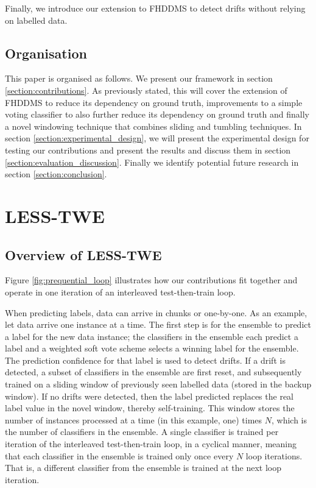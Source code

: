 \documentclass[runningheads]{llncs}
\begin{document}
Finally, we introduce our extension to FHDDMS to detect drifts without relying on labelled data.
\subsection{Organisation}
This paper is organised as follows. 
We present our framework in section \ref{section:contributions}. As previously stated, this will cover the extension of FHDDMS to reduce its dependency on ground truth, improvements to a simple voting classifier to also further reduce its dependency on ground truth and finally a novel windowing technique that combines sliding and tumbling techniques. In section \ref{section:experimental_design}, we will present the experimental design for testing our contributions and present the results and discuss them in section \ref{section:evaluation_discussion}. Finally we identify potential future research in section \ref{section:conclusion}.

\section{LESS-TWE\label{section:contributions}}
\subsection{Overview of LESS-TWE}
Figure \ref{fig:prequential_loop} illustrates how our contributions fit together and operate in one iteration of an interleaved test-then-train loop.

When predicting labels, data can arrive in chunks or one-by-one. As an example, let data arrive one instance at a time. The first step is for the ensemble to predict a label for the new data instance; the classifiers in the ensemble each predict a label and a weighted soft vote scheme selects a winning label for the ensemble. The prediction confidence for that label is used to detect drifts. If a drift is detected, a subset of classifiers in the ensemble are first reset, and subsequently trained on a sliding window of previously seen labelled data (stored in the backup window). If no drifts were detected, then the label predicted replaces the real label value in the novel window, thereby self-training. This window stores the number of instances processed at a time (in this example, one) times $N$, which is the number of classifiers in the ensemble. A single classifier is trained per iteration of the interleaved test-then-train loop, in a cyclical manner, meaning that each classifier in the ensemble is trained only once every $N$ loop iterations. That is, a different classifier from the ensemble is trained at the next loop iteration.
\end{document}
